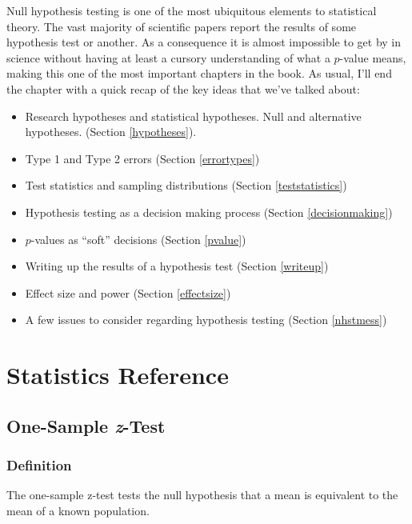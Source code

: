 \documentclass[
]{book}
\providecommand{\tightlist}{%
  \setlength{\itemsep}{0pt}\setlength{\parskip}{0pt}}
\begin{document}
Null hypothesis testing is one of the most ubiquitous elements to statistical theory. The vast majority of scientific papers report the results of some hypothesis test or another. As a consequence it is almost impossible to get by in science without having at least a cursory understanding of what a \(p\)-value means, making this one of the most important chapters in the book. As usual, I'll end the chapter with a quick recap of the key ideas that we've talked about:

\begin{itemize}
\tightlist
\item
  Research hypotheses and statistical hypotheses. Null and alternative hypotheses. (Section \ref{hypotheses}).
\item
  Type 1 and Type 2 errors (Section \ref{errortypes})
\item
  Test statistics and sampling distributions (Section \ref{teststatistics})
\item
  Hypothesis testing as a decision making process (Section \ref{decisionmaking})
\item
  \(p\)-values as ``soft'' decisions (Section \ref{pvalue})
\item
  Writing up the results of a hypothesis test (Section \ref{writeup})
\item
  Effect size and power (Section \ref{effectsize})
\item
  A few issues to consider regarding hypothesis testing (Section \ref{nhstmess})
\end{itemize}

\hypertarget{statistics-reference}{%
\chapter{Statistics Reference}\label{statistics-reference}}

\hypertarget{one-sample-z-test}{%
\section{\texorpdfstring{One-Sample \emph{z}-Test}{One-Sample z-Test}}\label{one-sample-z-test}}

\hypertarget{definition}{%
\subsection{Definition}\label{definition}}

The one-sample z-test tests the null hypothesis that a mean is equivalent to the mean of a known population.
\end{document}

